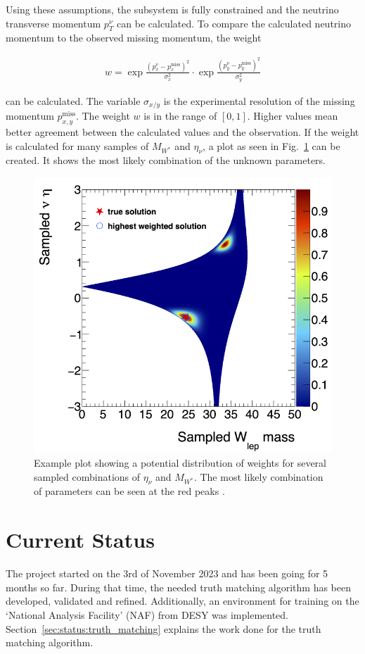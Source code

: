 \documentclass[bachelor,ngerman,english]{GAUBM}
\begin{document}
Using these assumptions, the \HWW subsystem is fully constrained \cite{neutrino_weighting} and the neutrino transverse momentum $p_T^\nu$ can be calculated. To compare the calculated neutrino momentum to the observed missing momentum, the weight 

\begin{align}
    w = \exp{\frac{(p_x^\nu-p_x^\text{miss})^2}{\sigma_x^2}} \cdot \exp{\frac{(p_y^\nu-p_y^\text{miss})^2}{\sigma_y^2}}
\end{align}

can be calculated. The variable $\sigma_{x/y}$ is the experimental resolution of the missing momentum $p_{x,y}^\text{miss}$. The weight $w$ is in the range of $[0,1]$. Higher values mean better agreement between the calculated values and the observation. If the weight is calculated for many samples of $M_{W^*}$ and $\eta_\nu$, a plot as seen in Fig.~\ref{fig:neutrino_weighting} can be created. It shows the most likely combination of the unknown parameters.

\begin{figure}[t]
    \centering
    \includegraphics[width=.50\textwidth]{figures/methods/neutrino_weighting.png}
    \caption{Example plot showing a potential distribution of weights for several sampled combinations of $\eta_\nu$ and $M_{W^*}$. The most likely combination of parameters can be seen at the red peaks \cite{neutrino_weighting}.}
    \label{fig:neutrino_weighting}
\end{figure}


\chapter{Current Status}
\label{ch:current_status}
The project started on the 3rd of November 2023 and has been going for 5 months so far. During that time, the needed truth matching algorithm has been developed, validated and refined. Additionally, an environment for training \spanet on the `National Analysis Facility' (NAF) from DESY was implemented. Section~\ref{sec:status:truth_matching} explains the work done for the truth matching algorithm. 
\end{document}

